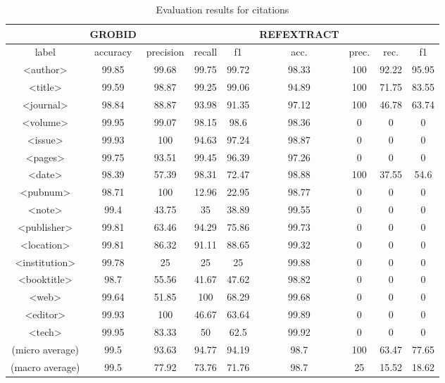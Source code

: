 \begin{table}[h]
\begin{center}
\begin{tabular}{|c|cccc|cccc|}
\hline
 & GROBID & & & & REFEXTRACT & & & \\
\hline
label & accuracy & precision & recall & f1 & acc. & prec. & rec. & f1\\
\hline
<author>	&	99.85	&	99.68	&	99.75	&	99.72 	& 98.33	&	100	&	92.22	&	95.95	\\
<title>	&	99.59	&	98.87	&	99.25	&	99.06 	& 94.89	&	100	&	71.75	&	83.55	\\
<journal>	&	98.84	&	88.87	&	93.98	&	91.35 	& 97.12	&	100	&	46.78	&	63.74	\\
<volume>&	99.95	&	99.07	&	98.15	&	98.6 		& 98.36	&	0	&	0		&	0	\\
<issue>	&	99.93	&	100		&	94.63	&	97.24	 & 98.87	&	0	&	0		&	0	\\
<pages>	&	99.75	&	93.51	&	99.45	&	96.39 	& 97.26	&	0	&	0		&	0	\\
<date>	&	98.39	&	57.39	&	98.31	&	72.47 	& 98.88	&	100	&	37.55	&	54.6	\\
<pubnum>&	98.71	&	100		&	12.96	&	22.95 	& 98.77	&	0	&	0		&	0	\\
<note>	&	99.4	 	&	43.75	&	35		&	38.89 	& 99.55	&	0	&	0		&	0	\\
<publisher>&	99.81	&	63.46	&	94.29	&	75.86 	& 99.73	&	0	&	0		&	0	\\
<location>&	99.81	&	86.32	&	91.11	&	88.65 	& 99.32	&	0	&	0		&	0	\\
<institution>&	99.78	&	25		&	25		&	25 		& 99.88	&	0	&	0		&	0	\\
<booktitle>&	98.7		&	55.56	&	41.67	&	47.62 	& 98.82	&	0	&	0		&	0	\\
<web>	&	99.64	&	51.85	&	100		&	68.29 	& 99.68	&	0	&	0		&	0	\\
<editor>	&	99.93	&	100		&46.67		&	63.64 	& 99.89	&	0	&	0		&	0	\\
<tech>	&	99.95	&	83.33	&	50		&	62.5 		& 99.92	&	0	&	0		&	0	\\
\hline
(micro average) & 99.5	&	93.63	&	94.77 	&	94.19 & 98.7	&	100	&	63.47 	&	77.65	\\
(macro average) & 99.5	&	77.92	&	73.76	&	71.76 & 98.7	&	25	&	15.52	&	18.62	\\
\hline
\end{tabular}
\caption[Table caption text]{Evaluation results for citations}
\end{center}
\end{table}
